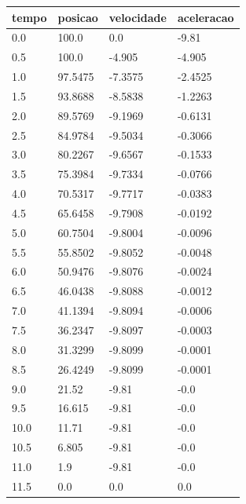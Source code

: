 \begin{tabular}{llll}
\toprule
tempo & posicao & velocidade & aceleracao \\
\midrule
0.0 & 100.0 & 0.0 & -9.81 \\
0.5 & 100.0 & -4.905 & -4.905 \\
1.0 & 97.5475 & -7.3575 & -2.4525 \\
1.5 & 93.8688 & -8.5838 & -1.2263 \\
2.0 & 89.5769 & -9.1969 & -0.6131 \\
2.5 & 84.9784 & -9.5034 & -0.3066 \\
3.0 & 80.2267 & -9.6567 & -0.1533 \\
3.5 & 75.3984 & -9.7334 & -0.0766 \\
4.0 & 70.5317 & -9.7717 & -0.0383 \\
4.5 & 65.6458 & -9.7908 & -0.0192 \\
5.0 & 60.7504 & -9.8004 & -0.0096 \\
5.5 & 55.8502 & -9.8052 & -0.0048 \\
6.0 & 50.9476 & -9.8076 & -0.0024 \\
6.5 & 46.0438 & -9.8088 & -0.0012 \\
7.0 & 41.1394 & -9.8094 & -0.0006 \\
7.5 & 36.2347 & -9.8097 & -0.0003 \\
8.0 & 31.3299 & -9.8099 & -0.0001 \\
8.5 & 26.4249 & -9.8099 & -0.0001 \\
9.0 & 21.52 & -9.81 & -0.0 \\
9.5 & 16.615 & -9.81 & -0.0 \\
10.0 & 11.71 & -9.81 & -0.0 \\
10.5 & 6.805 & -9.81 & -0.0 \\
11.0 & 1.9 & -9.81 & -0.0 \\
11.5 & 0.0 & 0.0 & 0.0 \\
\bottomrule
\end{tabular}
